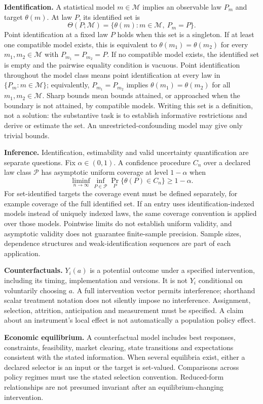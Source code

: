 \documentclass[11pt,a4paper]{article}
\begin{document}
\textbf{Identification.} A statistical model $m\in\mathcal M$ implies an observable law $P_m$ and target $\theta(m)$. At law $P$, its identified set is
\[
\Theta(P;\mathcal M)=\{\theta(m):m\in\mathcal M,\ P_m=P\}.
\]
Point identification at a fixed law $P$ holds when this set is a singleton. If at least one compatible model exists, this is equivalent to $\theta(m_1)=\theta(m_2)$ for every $m_1,m_2\in\mathcal M$ with $P_{m_1}=P_{m_2}=P$. If no compatible model exists, the identified set is empty and the pairwise equality condition is vacuous. Point identification throughout the model class means point identification at every law in $\{P_m:m\in\mathcal M\}$; equivalently, $P_{m_1}=P_{m_2}$ implies $\theta(m_1)=\theta(m_2)$ for all $m_1,m_2\in\mathcal M$. Sharp bounds mean bounds attained, or approached when the boundary is not attained, by compatible models. Writing this set is a definition, not a solution: the substantive task is to establish informative restrictions and derive or estimate the set. An unrestricted-confounding model may give only trivial bounds.

\textbf{Inference.} Identification, estimability and valid uncertainty quantification are separate questions. Fix $\alpha\in(0,1)$. A confidence procedure $C_n$ over a declared law class $\mathcal P$ has asymptotic uniform coverage at level $1-\alpha$ when
\[
\liminf_{n\to\infty}\inf_{P\in\mathcal P}\Pr_P\{\theta(P)\in C_n\}\geq1-\alpha.
\]
For set-identified targets the coverage event must be defined separately, for example coverage of the full identified set. If an entry uses identification-indexed models instead of uniquely indexed laws, the same coverage convention is applied over those models. Pointwise limits do not establish uniform validity, and asymptotic validity does not guarantee finite-sample precision. Sample sizes, dependence structures and weak-identification sequences are part of each application.

\textbf{Counterfactuals.} $Y_i(a)$ is a potential outcome under a specified intervention, including its timing, implementation and versions. It is not $Y_i$ conditional on voluntarily choosing $a$. A full intervention vector permits interference; shorthand scalar treatment notation does not silently impose no interference. Assignment, selection, attrition, anticipation and measurement must be specified. A claim about an instrument's local effect is not automatically a population policy effect.

\textbf{Economic equilibrium.} A counterfactual model includes best responses, constraints, feasibility, market clearing, state transitions and expectations consistent with the stated information. When several equilibria exist, either a declared selector is an input or the target is set-valued. Comparisons across policy regimes must use the stated selection convention. Reduced-form relationships are not presumed invariant after an equilibrium-changing intervention.
\end{document}
